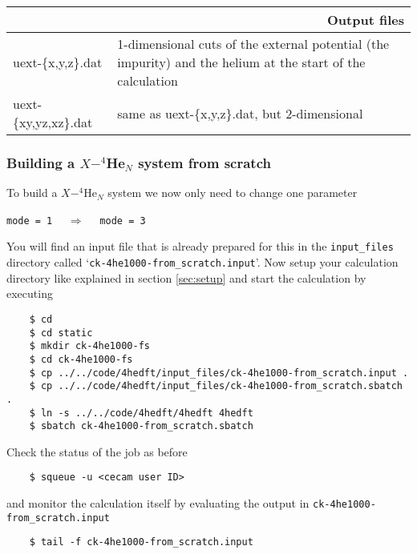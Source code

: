 \documentclass[10pt,a4paper]{article}
\begin{document}
	\begin{center}
		\begin{tabular}{l|p{7.5cm}}
			\multicolumn{2}{r}{\textbf{Output files}} \\
			\hline\hline
			uext-\{x,y,z\}.dat			& 1-dimensional cuts of the external potential (the impurity) and the helium at the start of the calculation \\
			\hline
			uext-\{xy,yz,xz\}.dat				& same as uext-\{x,y,z\}.dat, but 2-dimensional  \\
		\end{tabular}
	\end{center}
	
	\subsubsection{Building a $X-^4$He$_{N}$ system from scratch}\label{sec:ck-fs}
	To build a $X-^4$He$_N$ system we now only need to change one parameter
	\begin{center}
		\verb|mode = 1|	$\quad\Longrightarrow\quad$	\verb|mode = 3|
	\end{center}
	You will find an input file that is already prepared for this in the \verb|input_files| directory called `\verb|ck-4he1000-from_scratch.input|'. Now setup your calculation directory like explained in section \ref{sec:setup} and start the calculation by executing
	\begin{verbatim}
	$ cd 
	$ cd static
	$ mkdir ck-4he1000-fs
	$ cd ck-4he1000-fs
	$ cp ../../code/4hedft/input_files/ck-4he1000-from_scratch.input .
	$ cp ../../code/4hedft/input_files/ck-4he1000-from_scratch.sbatch .
	$ ln -s ../../code/4hedft/4hedft 4hedft
	$ sbatch ck-4he1000-from_scratch.sbatch
	\end{verbatim}
	Check the status of the job as before
	\begin{verbatim}
	$ squeue -u <cecam user ID>
	\end{verbatim}
	and monitor the calculation itself by evaluating the output in \verb|ck-4he1000-from_scratch.input|
	\begin{verbatim}
	$ tail -f ck-4he1000-from_scratch.input
	\end{verbatim}
	
\end{document}
